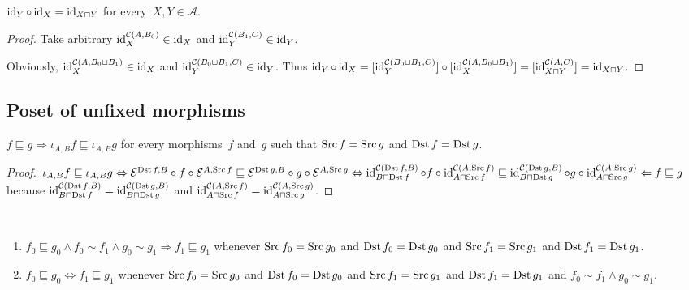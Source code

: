 \begin{prop}
$\operatorname{id}_Y\circ\operatorname{id}_X=\operatorname{id}_{X\sqcap Y}$ for
every~$X,Y\in\mathcal{A}$.
\end{prop}

\begin{proof}
Take arbitrary $\operatorname{id}^{\mathcal{C}(A,B_0)}_X\in\operatorname{id}_X$ and
$\operatorname{id}^{\mathcal{C}(B_1,C)}_Y\in\operatorname{id}_Y$.

Obviously,
$\operatorname{id}^{\mathcal{C}(A,B_0\sqcup B_1)}_X\in\operatorname{id}_X$ and
$\operatorname{id}^{\mathcal{C}(B_0\sqcup B_1,C)}_Y\in\operatorname{id}_Y$.
Thus
$\operatorname{id}_Y\circ\operatorname{id}_X=
[\operatorname{id}^{\mathcal{C}(B_0\sqcup B_1,C)}_Y]\circ
[\operatorname{id}^{\mathcal{C}(A,B_0\sqcup B_1)}_X]=
[\operatorname{id}^{\mathcal{C}(A,C)}_{X\sqcap Y}]=
\operatorname{id}_{X\sqcap Y}$.
\end{proof}

\subsection{Poset of unfixed morphisms}

\begin{lem}
$f\sqsubseteq g\Rightarrow
\iota_{A,B}f\sqsubseteq\iota_{A,B}g$ for every
morphisms~$f$ and~$g$ such that
$\operatorname{Src} f=\operatorname{Src} g$ and $\operatorname{Dst} f=\operatorname{Dst} g$.
\end{lem}

\begin{proof}
$\iota_{A,B}f\sqsubseteq\iota_{A,B}g \Leftrightarrow
\mathcal{E}^{\operatorname{Dst} f,B}\circ f\circ\mathcal{E}^{A,\operatorname{Src} f}
\sqsubseteq
\mathcal{E}^{\operatorname{Dst} g,B}\circ g\circ\mathcal{E}^{A,\operatorname{Src} g}
\Leftrightarrow
\operatorname{id}^{\mathcal{C}(\operatorname{Dst} f,B)}_{B\sqcap\operatorname{Dst} f}\circ f\circ\operatorname{id}^{\mathcal{C}(A,\operatorname{Src} f)}_{A\sqcap\operatorname{Src} f}
\sqsubseteq
\operatorname{id}^{\mathcal{C}(\operatorname{Dst} g,B)}_{B\sqcap\operatorname{Dst} g}\circ g\circ\operatorname{id}^{\mathcal{C}(A,\operatorname{Src} g)}_{A\sqcap\operatorname{Src} g}
\Leftarrow f\sqsubseteq g$ because
$\operatorname{id}^{\mathcal{C}(\operatorname{Dst} f,B)}_{B\sqcap\operatorname{Dst} f}=
\operatorname{id}^{\mathcal{C}(\operatorname{Dst} g,B)}_{B\sqcap\operatorname{Dst} g}$ and
$\operatorname{id}^{\mathcal{C}(A,\operatorname{Src} f)}_{A\sqcap\operatorname{Src} f}=
\operatorname{id}^{\mathcal{C}(A,\operatorname{Src} g)}_{A\sqcap\operatorname{Src} g}$.
\end{proof}

\begin{cor}\label{unxif-org-cong}
~
\begin{enumerate}
\item\label{unxif-org-cong-impl}
$f_0\sqsubseteq g_0\land f_0\sim f_1\land g_0\sim g_1
\Rightarrow f_1\sqsubseteq g_1$ whenever
$\operatorname{Src} f_0=\operatorname{Src} g_0$ and $\operatorname{Dst} f_0=\operatorname{Dst} g_0$ and
$\operatorname{Src} f_1=\operatorname{Src} g_1$ and $\operatorname{Dst} f_1=\operatorname{Dst} g_1$.
\item\label{unxif-org-cong-eq}
$f_0\sqsubseteq g_0\Leftrightarrow f_1\sqsubseteq g_1$ whenever
$\operatorname{Src} f_0=\operatorname{Src} g_0$ and $\operatorname{Dst} f_0=\operatorname{Dst} g_0$ and
$\operatorname{Src} f_1=\operatorname{Src} g_1$ and $\operatorname{Dst} f_1=\operatorname{Dst} g_1$ and
$f_0\sim f_1\land g_0\sim g_1$.
\end{enumerate}
\end{cor}

